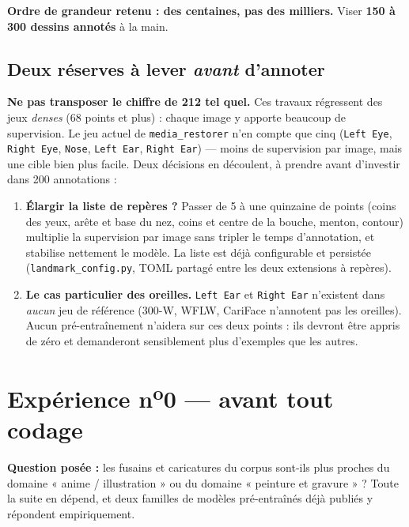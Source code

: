 \documentclass[11pt,a4paper]{article}
\newcommand{\aretenir}[1]{%
  \par\medskip
  \noindent\colorbox{encadre}{%
    \begin{minipage}{\dimexpr\linewidth-2\fboxsep}
      \vspace{2pt}#1\vspace{2pt}
    \end{minipage}}%
  \par\medskip
}
\newcommand{\alerte}[1]{\textcolor{alerte}{\textbf{#1}}}
\begin{document}
\aretenir{\textbf{Ordre de grandeur retenu : des centaines, pas des milliers.}
Viser \textbf{150 à 300 dessins annotés} à la main.}

\subsection*{Deux réserves à lever \emph{avant} d'annoter}

\alerte{Ne pas transposer le chiffre de 212 tel quel.} Ces travaux régressent des
jeux \emph{denses} (68 points et plus) : chaque image y apporte beaucoup de
supervision. Le jeu actuel de \texttt{media\_restorer} n'en compte que cinq
(\texttt{Left Eye}, \texttt{Right Eye}, \texttt{Nose}, \texttt{Left Ear},
\texttt{Right Ear}) — moins de supervision par image, mais une cible bien plus
facile. Deux décisions en découlent, à prendre avant d'investir dans
200 annotations :

\begin{enumerate}[leftmargin=*,itemsep=4pt]
  \item \textbf{Élargir la liste de repères ?} Passer de 5 à une quinzaine de
  points (coins des yeux, arête et base du nez, coins et centre de la bouche,
  menton, contour) multiplie la supervision par image sans tripler le temps
  d'annotation, et stabilise nettement le modèle. La liste est déjà configurable
  et persistée (\texttt{landmark\_config.py}, TOML partagé entre les deux
  extensions à repères).

  \item \textbf{Le cas particulier des oreilles.} \texttt{Left Ear} et
  \texttt{Right Ear} n'existent dans \emph{aucun} jeu de référence (300-W, WFLW,
  CariFace n'annotent pas les oreilles). Aucun pré-entraînement n'aidera sur ces
  deux points : ils devront être appris de zéro et demanderont sensiblement plus
  d'exemples que les autres.
\end{enumerate}

\section{Expérience n\textsuperscript{o}0 — avant tout codage}

\textbf{Question posée :} les fusains et caricatures du corpus sont-ils plus
proches du domaine « anime / illustration » ou du domaine « peinture et
gravure » ? Toute la suite en dépend, et deux familles de modèles pré-entraînés
déjà publiés y répondent empiriquement.
\end{document}
